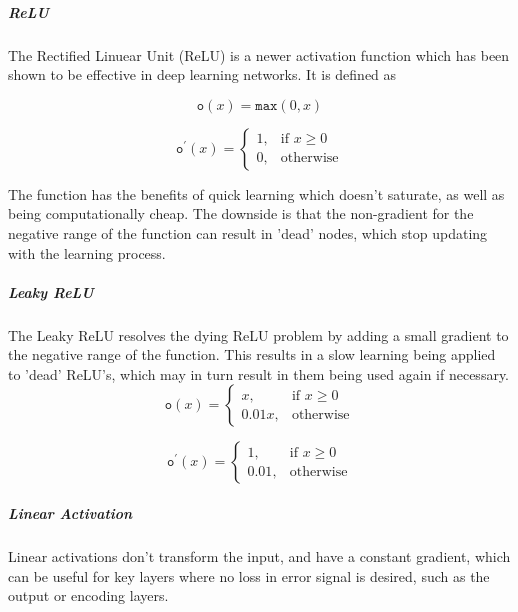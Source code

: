 \documentclass[a4paper,11pt,oneside]{article}
\theoremstyle{plain}
\theoremstyle{definition}
\begin{document}
\subparagraph{ReLU}

The Rectified Linuear Unit (ReLU) is a newer activation function which has been shown to be effective in deep learning networks. It is defined as

\begin{equation}\label{func_relu}
\texttt{o}(x) = \texttt{max}(0, x)
\end{equation}

\begin{equation}\end{equation}\label{func_relu_prime}
\[
\texttt{o}^\prime(x)= 
\begin{cases}
1,& \text{if } x\geq 0\\
0,              & \text{otherwise}
\end{cases}
\]

The function has the benefits of quick learning which doesn't saturate, as well as being computationally cheap. The downside is that the non-gradient for the negative range of the function can result in 'dead' nodes, which stop updating with the learning process.

\subparagraph{Leaky ReLU}

The Leaky ReLU resolves the dying ReLU problem by adding a small gradient to the negative range of the function. This results in a slow learning being applied to 'dead' ReLU's, which may in turn result in them being used again if necessary.
\begin{equation}\end{equation}\label{func_leaky_relu}
\[
\texttt{o}(x)= 
\begin{cases}
x,& \text{if } x\geq 0\\
0.01x,              & \text{otherwise}
\end{cases}
\]

\begin{equation}\end{equation}\label{func_leaky_relu_prime}
\[
\texttt{o}^\prime(x)= 
\begin{cases}
1,& \text{if } x\geq 0\\
0.01,              & \text{otherwise}
\end{cases}
\]

\subparagraph{Linear Activation}

Linear activations don't transform the input, and have a constant gradient, which can be useful for key layers where no loss in error signal is desired, such as the output or encoding layers.
\end{document}
